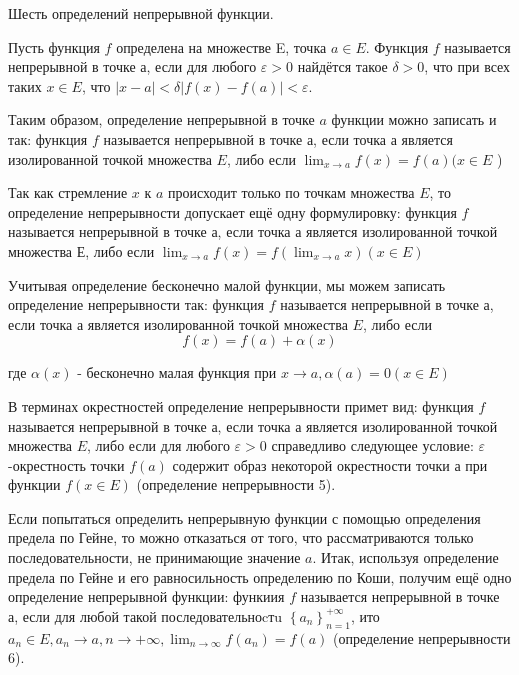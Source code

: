 \newpage
\begin{problem}
Шесть определений непрерывной функции.
\end{problem}
\begin{definition}
    Пусть функция $f$ определена на множестве E, точка $a \in E$. Функция $f$ называется непрерывной в точке $а$, если для любого $\varepsilon>0$ найдётся такое $\delta>0$, что при всех таких $x \in E$, что $|x-a|<\delta|f(x)-f(a)|<\varepsilon$.
\end{definition}

\begin{definition}
    Таким образом, определение непрерывной в точке $a$ функции можно записать и так: функция $f$ называется непрерывной в точке а, если точка а является изолированной точкой множества $E$, либо если $\lim _{x \rightarrow a} f(x)=f(a)(x \in E$ )
\end{definition}

\begin{definition}
    Так как стремление $x$ к $a$ происходит только по точкам множества $E$, то определение непрерывности допускает ещё одну формулировку: функция $f$ называется непрерывной в точке а, если точка а является изолированной точкой множества Е, либо если $\lim _{x \rightarrow a} f(x)=f\left(\lim _{x \rightarrow a} x\right)(x \in E)$
\end{definition}

\begin{definition}
    Учитывая определение бесконечно малой функции, мы можем записать определение непрерывности так: функция $f$ называется непрерывной в точке а, если точка а является изолированной точкой множества $E$, либо если
    $$
        f(x)=f(a)+\alpha(x)
    $$

    где $\alpha(x)$ - бесконечно малая функция при $x \rightarrow a, \alpha(a)=0(x \in E)$
\end{definition}

\begin{definition}
    В терминах окрестностей определение непрерывности примет вид: функция $f$ называется непрерывной в точке а, если точка а является изолированной точкой множества $E$, либо если для любого $\varepsilon>0$ справедливо следующее условие: $\varepsilon$-окрестность точки $f(a)$ содержит образ некоторой окрестности точки а при функции $f(x \in E)$ (определение непрерывности 5).
\end{definition}

\begin{definition}
    Если попытаться определить непрерывную функции с помощью определения предела по Гейне, то можно отказаться от того, что рассматриваются только последовательности, не принимающие значение $a$. Итак, используя определение предела по Гейне и его равносильность определению по Коши, получим ещё одно определение непрерывной функции: функиия $f$ называется непрерывной в точке а, если для любой такой последовательноcтu $\left\{a_n\right\}_{n=1}^{+\infty}$, ито $a_n \in E, a_n \rightarrow a, n \rightarrow+\infty, \lim _{n \rightarrow \infty} f\left(a_n\right)=f(a)$ (определение непрерывности 6).
\end{definition}

